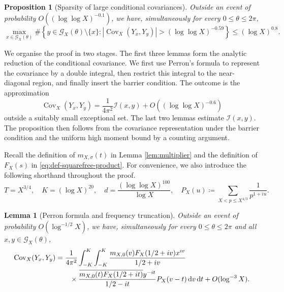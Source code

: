 \documentclass[a4paper,12pt,reqno]{amsart}
\numberwithin{equation}{section}
\newtheorem{lemma}[theorem]{Lemma}
\newtheorem{proposition}[theorem]{Proposition}
\theoremstyle{remark}
\newcommand{\cov}{\operatorname{Cov}}
\begin{document}
\begin{proposition}[Sparsity of large conditional covariances]
\label{prop:weighted-covariance}
Outside an event of probability $O((\log\log X)^{-0.1})$, we have,
simultaneously for every $0\leq\theta\leq2\pi$,
\[
 \max_{x\in{\mathcal G}_X(\theta)}
 \#\left\{y\in{\mathcal G}_X(\theta)\setminus\{x\}:
 |\cov_X(Y_x,Y_y)|>(\log\log X)^{-0.59}\right\}
 \leq(\log X)^{0.8}.
\]
\end{proposition}


We organise the proof in two stages. The first three lemmas form the
analytic reduction of the conditional covariance. We first use Perron's
formula to represent the covariance by a double integral, then
restrict this integral to the near-diagonal region, and finally insert the
barrier condition. The outcome is the approximation
\[
 \cov_X(Y_x,Y_y)
 =\frac{1}{4\pi^2}{\mathcal I}(x,y)
 +O((\log\log X)^{-0.6})
\]
outside a suitably small exceptional set.
The last two lemmas estimate ${\mathcal I}(x,y)$. %
The proposition then follows from the covariance representation under the
barrier condition and the uniform high moment bound by a counting argument.

Recall the definition of $m_{X,\sigma}(t)$ in Lemma \ref{lem:multiplier} and the definition of $ F_X(s)$ in \eqref{eq:def-squarefree-product}. For convenience, we also introduce the following shorthand throughout the proof.
\[
 T=X^{3/4},\quad K=(\log X)^{20},\quad
 d=\frac{(\log\log X)^{100}}{\log X},
 \quad
 P_X(u)\coloneqq\sum_{X<p\leq X^{4/3}}\frac1{p^{1+iu}}.
\]


\begin{lemma}[Perron formula and frequency truncation]
\label{lem:cov-perron}
Outside an event of probability $O(\log^{-1/2}X)$, we have,
simultaneously for every $0\leq\theta\leq2\pi$ and all
$x,y\in{\mathcal G}_X(\theta)$,
\begin{align}
 \cov_X(Y_x,Y_y)
 &=\frac1{4\pi^2}\int_{-K}^{K}\int_{-K}^{K}
 \frac{m_{X,0}(v)F_X(1/2+iv)x^{iv}}{1/2+iv}\notag\\
 &\qquad\times
 \frac{\overline{m_{X,0}(t)F_X(1/2+it)}y^{-it}}{1/2-it}
 P_X(v-t)\,\mathrm{d}v\,\mathrm{d}t+O(\log^{-3}X).
 \label{eq:compact-covariance}
\end{align}
\end{lemma}
\end{document}
